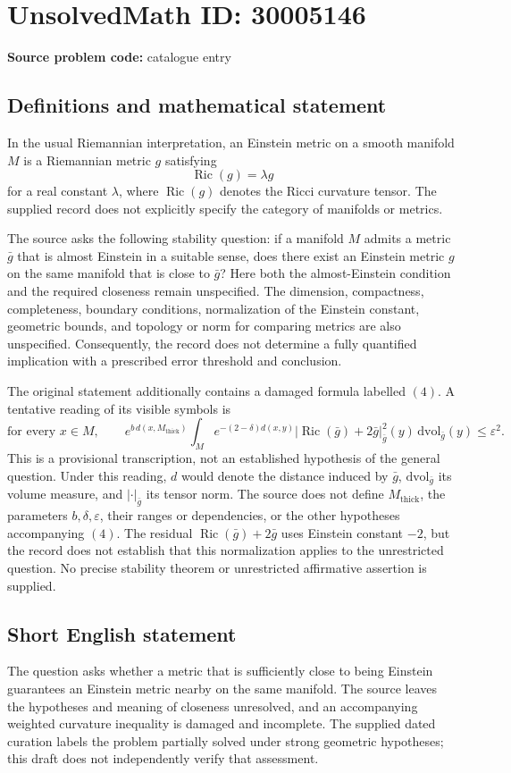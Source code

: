 \documentclass[11pt]{article}
\begin{document}
\section*{UnsolvedMath ID: 30005146}
\textbf{Source problem code:} catalogue entry
\subsection{Definitions and mathematical statement}
In the usual Riemannian interpretation, an Einstein metric on a smooth manifold \(M\) is a Riemannian metric \(g\) satisfying
\[
\operatorname{Ric}(g)=\lambda g
\]
for a real constant \(\lambda\), where \(\operatorname{Ric}(g)\) denotes the Ricci curvature tensor. The supplied record does not explicitly specify the category of manifolds or metrics.

The source asks the following stability question: if a manifold \(M\) admits a metric \(\bar g\) that is almost Einstein in a suitable sense, does there exist an Einstein metric \(g\) on the same manifold that is close to \(\bar g\)? Here both the almost-Einstein condition and the required closeness remain unspecified. The dimension, compactness, completeness, boundary conditions, normalization of the Einstein constant, geometric bounds, and topology or norm for comparing metrics are also unspecified. Consequently, the record does not determine a fully quantified implication with a prescribed error threshold and conclusion.

The original statement additionally contains a damaged formula labelled \((4)\). A tentative reading of its visible symbols is
\[
\text{for every }x\in M,\qquad
 e^{b\,d(x,M_{\mathrm{thick}})}
 \int_M e^{-(2-\delta)d(x,y)}
 \bigl|\operatorname{Ric}(\bar g)+2\bar g\bigr|_{\bar g}^{2}(y)
 \,\mathrm{dvol}_{\bar g}(y)
 \leq \varepsilon^{2}.
\tag{4}
\]
This is a provisional transcription, not an established hypothesis of the general question. Under this reading, \(d\) would denote the distance induced by \(\bar g\), \(\mathrm{dvol}_{\bar g}\) its volume measure, and \(|\cdot|_{\bar g}\) its tensor norm. The source does not define \(M_{\mathrm{thick}}\), the parameters \(b,\delta,\varepsilon\), their ranges or dependencies, or the other hypotheses accompanying \((4)\). The residual \(\operatorname{Ric}(\bar g)+2\bar g\) uses Einstein constant \(-2\), but the record does not establish that this normalization applies to the unrestricted question. No precise stability theorem or unrestricted affirmative assertion is supplied.
\subsection{Short English statement}
The question asks whether a metric that is sufficiently close to being Einstein guarantees an Einstein metric nearby on the same manifold. The source leaves the hypotheses and meaning of closeness unresolved, and an accompanying weighted curvature inequality is damaged and incomplete. The supplied dated curation labels the problem partially solved under strong geometric hypotheses; this draft does not independently verify that assessment.
\end{document}

